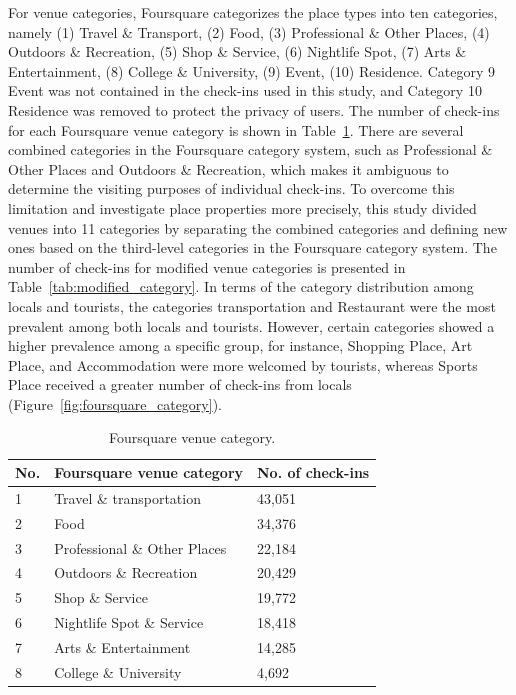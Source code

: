 \documentclass{article}
\theoremstyle{remark}
\begin{document}
For venue categories, Foursquare categorizes the place types into ten categories, namely (1) Travel \& Transport, (2) Food, (3) Professional \& Other Places, (4) Outdoors \& Recreation, (5) Shop \& Service, (6) Nightlife Spot, (7) Arts \& Entertainment, (8) College \& University, (9) Event, (10) Residence. Category 9 Event was not contained in the check-ins used in this study, and Category 10 Residence was removed to protect the privacy of users. The number of check-ins for each Foursquare venue category is shown in Table~\ref{tab:foursquare_category}. There are several combined categories in the Foursquare category system, such as Professional \& Other Places and Outdoors \& Recreation, which makes it ambiguous to determine the visiting purposes of individual check-ins. To overcome this limitation and investigate place properties more precisely, this study divided venues into 11 categories by separating the combined categories and defining new ones based on the third-level categories in the Foursquare category system. The number of check-ins for modified venue categories is presented in Table~\ref{tab:modified_category}. In terms of the category distribution among locals and tourists, the categories transportation and Restaurant were the most prevalent among both locals and tourists. However, certain categories showed a higher prevalence among a specific group, for instance, Shopping Place, Art Place, and Accommodation were more welcomed by tourists, whereas Sports Place received a greater number of check-ins from locals (Figure~\ref{fig:foursquare_category}).

\begin{table}[h!]
\centering
\caption{\label{tab:foursquare_category}Foursquare venue category.}
\begin{tabular}{lll} \hline
No. & Foursquare venue category & No. of check-ins \\ \hline
1 & Travel \& transportation & 43,051 \\
2 & Food & 34,376 \\
3 & Professional \& Other Places & 22,184 \\
4 & Outdoors \& Recreation & 20,429 \\
5 & Shop \& Service & 19,772 \\
6 & Nightlife Spot \& Service & 18,418 \\
7 & Arts \& Entertainment & 14,285 \\
8 & College \& University & 4,692 \\ \hline
\end{tabular}
\end{table}
\end{document}
